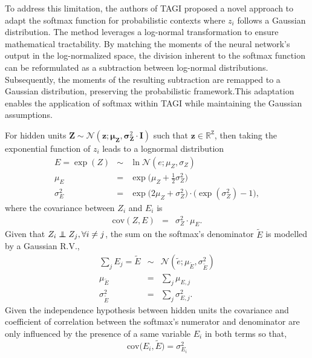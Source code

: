 \documentclass{article}
\newcommand\independent{\protect\mathpalette{\protect\independenT}{\perp}}
\def\independenT#1#2{\mathrel{\rlap{$#1#2$}\mkern2mu{#1#2}}}
\begin{document}
To address this limitation, the authors of TAGI \cite{goulet2020tractable} proposed a novel approach to adapt the softmax function for probabilistic contexts where  $z_i$  follows a Gaussian distribution. The method leverages a log-normal transformation to ensure mathematical tractability. By matching the moments of the neural network’s output in the log-normalized space, the division inherent to the softmax function can be reformulated as a subtraction between log-normal distributions. Subsequently, the moments of the resulting subtraction are remapped to a Gaussian distribution, preserving the probabilistic framework.This adaptation enables the application of softmax within TAGI while maintaining the Gaussian assumptions.

For hidden units $\bm{Z}\sim\mathcal{N}(\bm{z};\bm{\mu}_{\bm{Z}},\bm{\sigma}_{\bm{Z}}^2\cdot \mathbf{I})$ such that $\bm{z}\in \mathbb{R}^\mathtt{Z}$, then taking the exponential function of $z_i$ leads to a lognormal distribution
\begin{equation}
\begin{array}{rcll}
E=\exp(Z)&\sim& \ln\mathcal{N}(e;\mu_{Z},\sigma_{Z})\\[2pt]
\mu_E&=&\exp\big(\mu_Z+\tfrac{1}{2}\sigma_Z^2\big)\\[2pt]
\sigma_E^2&=&\exp\big(2\mu_Z+\sigma_Z^2\big)\cdot\big(\exp(\sigma_Z^2)-1\big),
\end{array}
\end{equation}
where the covariance between $Z_i$ and $E_i$ is
\begin{equation} 
\begin{array}{rcl}
\text{cov}(Z,E)&=&\sigma_Z^2\cdot\mu_E.
\end{array}
\end{equation}
Given that $Z_i\independent Z_j,\forall i\neq j$, the sum on the softmax's denominator $\tilde{E}$ is modelled by a Gaussian R.V., 
\begin{equation}
\begin{array}{rcl}
\sum_j E_j=\tilde{E}&\sim&\mathcal{N}(\tilde{e};\mu_{\tilde{E}},\sigma_{\tilde{E}}^2)\\[2pt]
\mu_{\tilde{E}}&=&\sum_j \mu_{E,j}\\[2pt]
\sigma_{\tilde{E}}^2&=&\sum_j \sigma_{E,j}^2.
\end{array}
\end{equation}
Given the independence hypothesis between hidden units the covariance and coefficient of correlation between the softmax's numerator and denominator are only influenced by the presence of a same variable $E_i$ in both terms so that, 
\begin{equation}
\text{cov}\big(E_i,\tilde{E}\big)=\sigma_{E_i}^2
\end{equation}
\end{document}
